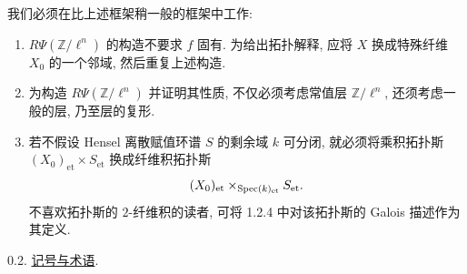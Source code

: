我们必须在比上述框架稍一般的框架中工作:
\begin{enumerate}[label=\alph*),leftmargin=2.5em]
\item $R\Psi(\mathbb Z/\ell^n)$ 的构造不要求 $f$ 固有. 为给出拓扑解释, 应将 $X$ 换成特殊纤维 $X_0$ 的一个邻域, 然后重复上述构造.

\item 为构造 $R\Psi(\mathbb Z/\ell^n)$ 并证明其性质, 不仅必须考虑常值层 $\mathbb Z/\ell^n$, 还须考虑一般的层, 乃至层的复形.

\item 若不假设 Hensel 离散赋值环谱 $S$ 的剩余域 $k$ 可分闭, 就必须将乘积拓扑斯 $(X_0)_{\mathrm{et}}\times S_{\mathrm{et}}$ 换成纤维积拓扑斯
\begin{equation*}
(X_0)_{\mathrm{et}}
\times_{\operatorname{Spec}(k)_{\mathrm{et}}}S_{\mathrm{et}}.
\end{equation*}
不喜欢拓扑斯的 $2$-纤维积的读者, 可将 1.2.4 中对该拓扑斯的 Galois 描述作为其定义.
\end{enumerate}


0.2. \underline{记号与术语}.

